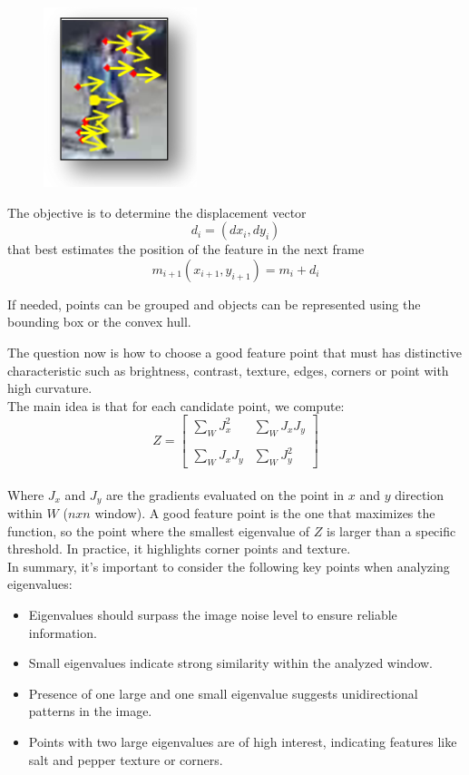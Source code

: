\begin{figure}
    \includegraphics[scale=0.3]{Figures/Tracking.png}
\end{figure}
The objective is to determine the displacement vector \[d_i = (dx_i, dy_i)\] that best estimates the position of the feature in the next frame \[m_{i+1}(x_{i+1}, y_{i+1}) = m_i + d_i\]

If needed, points can be grouped and objects can be represented using the bounding box or the convex hull.

The question now is how to choose a good feature point that must has distinctive characteristic such as brightness, contrast, texture, edges, corners or point with high curvature.
\\The main idea is that for each candidate point, we compute: 
\[
    Z = \begin{bmatrix}
        \sum_{W}^{}J_x^2 & \sum_{W}^{}J_xJ_y \\
        \\
        \sum_{W}^{}J_xJ_y & \sum_{W}^{}J_y^2
    \end{bmatrix}
\]
\\Where $J_x$ and $J_y$ are the gradients evaluated on the point in $x$ and $y$ direction within $W$ ($nxn$ window). 
A good feature point is the one that maximizes the function, so the point where the smallest eigenvalue of $Z$ is larger than a specific threshold.
In practice, it highlights corner points and texture.
\\In summary, it's important to consider the following key points when analyzing eigenvalues:
\begin{itemize}
    \item Eigenvalues should surpass the image noise level to ensure reliable information.
    \item Small eigenvalues indicate strong similarity within the analyzed window.
    \item Presence of one large and one small eigenvalue suggests unidirectional patterns in the image.
    \item Points with two large eigenvalues are of high interest, indicating features like salt and pepper texture or corners.
\end{itemize}

